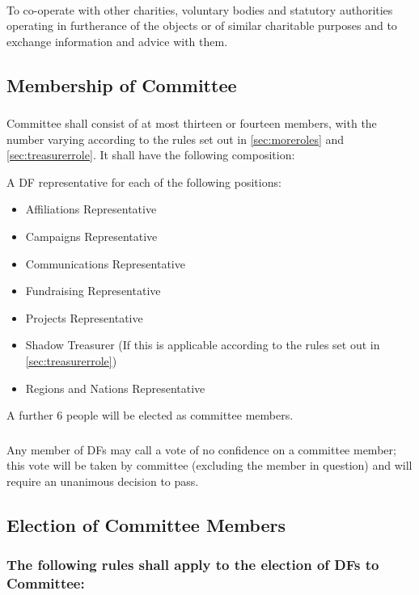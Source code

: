 \documentclass[a4paper, 12pt]{article}
\begin{document}
\paragraph{}
To co-operate with other charities, voluntary bodies and statutory authorities operating in furtherance of the objects or of similar charitable purposes and to exchange information and advice with them.

\subsection{Membership of Committee}
\subsubsection{}
\label{sec:cttemembership}
Committee shall consist of at most thirteen or fourteen members, with the number varying according to the rules set out in \ref{sec:moreroles} and \ref{sec:treasurerrole}. It shall have the following composition:

A DF representative for each of the following positions:
\begin{itemize}
\item Affiliations Representative
\item Campaigns Representative
\item Communications Representative
\item Fundraising Representative
\item Projects Representative
\item Shadow Treasurer (If this is applicable according to the rules set out in \ref{sec:treasurerrole})
\item Regions and Nations Representative
\end{itemize}
A further 6 people will be elected as committee members.

\subsubsection{}
Any member of DFs may call a vote of no confidence on a committee member; this vote will be taken by committee (excluding the member in question) and will require an unanimous decision to pass.

\subsection{Election of Committee Members}
\label{sec:election}
\subsubsection{The following rules shall apply to the election of DFs to Committee:}
\end{document}
